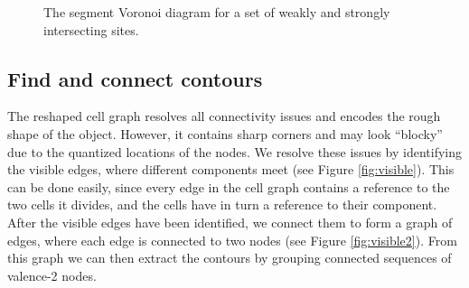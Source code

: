 \documentclass[]{usiinfbachelorproject}
\begin{document}
\begin{figure}[ht]
	\centering
	\caption{The segment Voronoi diagram for a set of weakly  and strongly  intersecting sites.}
	\label{fig:voronoisegm}
\end{figure}


\subsection{Find and connect contours} \label{sec:findedges}

The reshaped cell graph resolves all connectivity issues and encodes the rough shape of the object. However, it contains sharp corners and may look ``blocky'' due to the quantized locations of the nodes. We resolve these issues by identifying the visible edges, where different components meet (see Figure \ref{fig:visible}). This can be done easily, since every edge in the cell graph contains a reference to the two cells it divides, and the cells have in turn a reference to their component.\\
After the visible edges have been identified, we connect them to form a graph of edges, where each edge is connected to two nodes (see Figure \ref{fig:visible2}). From this graph we can then extract the contours by grouping connected sequences of valence-2 nodes.
\end{document}
